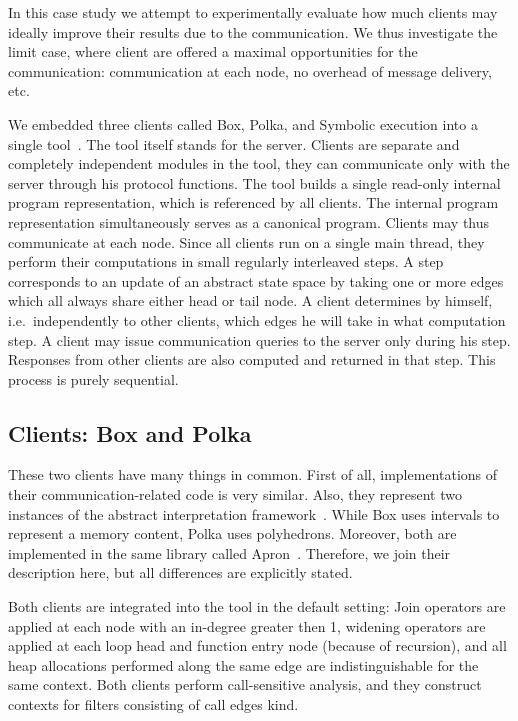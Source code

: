\documentclass[envcountsame]{llncs}
\begin{document}
In this case study we attempt to experimentally evaluate how much clients may
ideally improve their results due to the communication. We thus investigate the
limit case, where client are offered a maximal opportunities for the
communication: communication at each node, no overhead of message delivery, etc.

We embedded three clients called Box, Polka, and Symbolic execution into a
single tool~\cite{StatorURL}. The tool itself stands for the server.
Clients are separate and completely independent modules in the tool, they can
communicate only with the server through his protocol functions. The tool builds
a single read-only internal program representation, which is referenced by all
clients. The internal program representation simultaneously serves as a
canonical program. Clients may thus communicate at each node. Since all clients
run on a single main thread, they perform their computations in small regularly
interleaved steps. A step corresponds to an update of an abstract state space by
taking one or more edges which all always share either head or tail node. A
client determines by himself, i.e.~independently to other clients, which edges
he will take in what computation step. A client may issue communication queries
to the server only during his step. Responses from other clients are also
computed and returned in that step. This process is purely sequential.


\subsection{Clients: Box and Polka}
\label{sec:BoxPolka}

These two clients have many things in common. First of all, implementations of
their communication-related code is very similar. Also, they represent two
instances of the abstract interpretation framework~\cite{AI_CousotCousot77}.
While Box uses intervals to represent a memory content, Polka uses polyhedrons.
Moreover, both are implemented in the same library called Apron~\cite{ApronURL}.
Therefore, we join their description here, but all differences are explicitly
stated.

Both clients are integrated into the tool in the default setting: Join operators
are applied at each node with an in-degree greater then 1, widening operators
are applied at each loop head and function entry node (because of recursion),
and all heap allocations performed along the same edge are indistinguishable for
the same context. Both clients perform call-sensitive analysis, and they
construct contexts for filters consisting of call edges kind.
\end{document}
